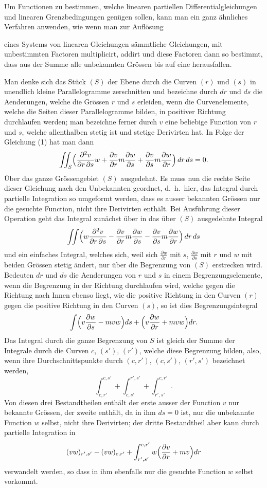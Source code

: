 \documentclass[12pt,a4paper]{book}
\theoremstyle{definition}
\theoremstyle{remark}
\begin{document}
Um Functionen zu bestimmen, welche linearen partiellen Differentialgleichungen und linearen Grenzbedingungen gen\"ugen sollen, kann man ein ganz \"ahnliches Verfahren anwenden, wie wenn man zur Aufl\"osung

eines Systems von linearen Gleichungen s\"ammtliche Gleichungen, mit unbestimmten Factoren multiplicirt, addirt und diese Factoren dann so bestimmt, dass aus der Summe alle unbekannten Gr\"ossen bis auf eine herausfallen.

Man denke sich das St\"uck $(S)$ der Ebene durch die Curven $(r)$ und $(s)$ in unendlich kleine Parallelogramme zerschnitten und bezeichne durch $dr$ und $ds$ die Aenderungen, welche die Gr\"ossen $r$ und $s$ erleiden, wenn die Curvenelemente, welche die Seiten dieser Parallelogramme bilden, in positiver Richtung durchlaufen werden; man bezeichne ferner durch $v$ eine beliebige Function von $r$ und $s$, welche allenthalben stetig ist und stetige Derivirten hat. In Folge der Gleichung (1) hat man dann
\[
\iint_{S}\Bigl(\frac{\partial^{2}v}{\partial r\,\partial s}w + \frac{\partial v}{\partial r}m\frac{\partial w}{\partial s} + \frac{\partial v}{\partial s}m\frac{\partial w}{\partial r}\Bigr)\,dr\,ds = 0.
\]
\"Uber das ganze Gr\"ossengebiet $(S)$ ausgedehnt. Es muss nun die rechte Seite dieser Gleichung nach den Unbekannten geordnet, d.~h.~hier, das Integral durch partielle Integration so umgeformt werden, dass es ausser bekannten Gr\"ossen nur die gesuchte Function, nicht ihre Derivirten enth\"alt. Bei Ausf\"uhrung dieser Operation geht das Integral zun\"achst \"uber in das \"uber $(S)$ ausgedehnte Integral
\[
\iint\Bigl(w\frac{\partial^{2}v}{\partial r\,\partial s} - \frac{\partial v}{\partial r}m\frac{\partial w}{\partial s} - \frac{\partial v}{\partial s}m\frac{\partial w}{\partial r}\Bigr)\,dr\,ds
\]
und ein einfaches Integral, welches sich, weil sich $\frac{\partial w}{\partial r}$ mit $s$, $\frac{\partial w}{\partial s}$ mit $r$ und $w$ mit beiden Gr\"ossen stetig \"andert, nur \"uber die Begrenzung von $(S)$ erstrecken wird. Bedeuten $dr$ und $ds$ die Aenderungen von $r$ und $s$ in einem Begrenzungselemente, wenn die Begrenzung in der Richtung durchlaufen wird, welche gegen die Richtung nach Innen ebenso liegt, wie die positive Richtung in den Curven $(r)$ gegen die positive Richtung in den Curven $(s)$, so ist dies Begrenzungsintegral
\[
\int\Bigl(v\frac{\partial w}{\partial s} - mvw\Bigr)ds + \Bigl(v\frac{\partial w}{\partial r} + mvw\Bigr)dr.
\]
Das Integral durch die ganze Begrenzung von $S$ ist gleich der Summe der Integrale durch die Curven $c$, $(s')$, $(r')$, welche diese Begrenzung bilden, also, wenn ihre Durchschnittspunkte durch $(c,r')$, $(c,s')$, $(r',s')$ bezeichnet werden,
\[
\int_{c,r'}^{c,s'} + \int_{c,s'}^{r',s'} + \int_{r',s'}^{c,r'}.
\]
Von diesen drei Bestandtheilen enth\"alt der erste ausser der Function $v$ nur bekannte Gr\"ossen, der zweite enth\"alt, da in ihm $ds = 0$ ist, nur die unbekannte Function $w$ selbst, nicht ihre Derivirten; der dritte Bestandtheil aber kann durch partielle Integration in
\[
(vw)_{r',s'} - (vw)_{c,r'} + \int_{r',s'}^{c,r'}w\Bigl(\frac{\partial v}{\partial r} + mv\Bigr)dr
\]
verwandelt werden, so dass in ihm ebenfalls nur die gesuchte Function $w$ selbst vorkommt.
\end{document}
